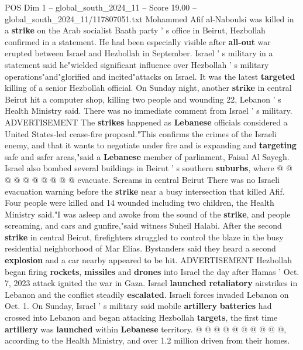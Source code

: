 \begin{textsample}{POS Dim 1 – global\_south\_2024\_11 – Score 19.00 – global\_south\_2024\_11/117807051.txt}  \label{ex:f1_pos_174}
Mohammed Afif al-Naboulsi was killed in a \textbf{strike} on the Arab socialist Baath party ' s office in Beirut, Hezbollah confirmed in a statement.
He had been especially visible after \textbf{all-out} war erupted between Israel and Hezbollah in September.
Israel ' s military in a statement said he"wielded significant influence over Hezbollah ' s military operations"and"glorified and incited"attacks on Israel.
It was the latest \textbf{targeted} killing of a senior Hezbollah official.
On Sunday night, another \textbf{strike} in central Beirut hit a computer shop, killing two people and wounding 22, Lebanon ' s Health Ministry said.
There was no immediate comment from Israel ' s military.
ADVERTISEMENT The \textbf{strikes} happened as \textbf{Lebanese} officials considered a United States-led cease-fire proposal."This confirms the crimes of the Israeli enemy, and that it wants to negotiate under fire and is expanding and \textbf{targeting} safe and safer areas,"said a \textbf{Lebanese} member of parliament, Faisal Al Sayegh.
Israel also bombed several buildings in Beirut ' s southern \textbf{suburbs}, where @ @ @ @ @ @ @ @ @ @ evacuate.
Screams in central Beirut There was no Israeli evacuation warning before the \textbf{strike} near a busy intersection that killed Afif.
Four people were killed and 14 wounded including two children, the Health Ministry said."I was asleep and awoke from the sound of the \textbf{strike}, and people screaming, and cars and gunfire,"said witness Suheil Halabi.
After the second \textbf{strike} in central Beirut, firefighters struggled to control the blaze in the busy residential neighborhood of Mar Elias.
Bystanders said they heard a second \textbf{explosion} and a car nearby appeared to be hit.
ADVERTISEMENT Hezbollah began firing \textbf{rockets}, \textbf{missiles} and \textbf{drones} into Israel the day after Hamas ' Oct. 7, 2023 attack ignited the war in Gaza.
Israel \textbf{launched} \textbf{retaliatory} airstrikes in Lebanon and the conflict steadily \textbf{escalated}.
Israeli forces invaded Lebanon on Oct. 1.
On Sunday, Israel ' s military said mobile \textbf{artillery} \textbf{batteries} had crossed into Lebanon and began attacking Hezbollah \textbf{targets}, the first time \textbf{artillery} was \textbf{launched} within \textbf{Lebanese} territory. @ @ @ @ @ @ @ @ @ @, according to the Health Ministry, and over 1.2 million driven from their homes.

\end{textsample}
